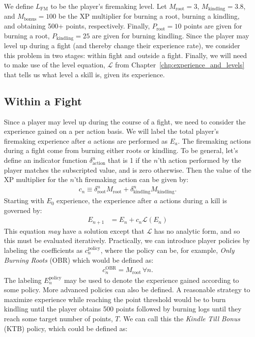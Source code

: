 	We define $L_\text{FM}$ to be the player's firemaking level. Let $M_\text{root}=3$, $M_\text{kindling}=3.8$, and $M_\text{bonus}=100$ be the XP multiplier for burning a root, burning a kindling, and obtaining 500+ points, respectively. Finally, $P_\text{root}=10$ points are given for burning a root, $P_\text{kindling}=25$ are given for burning kindling. Since the player may level up during a fight (and thereby change their experience rate), we consider this problem in two stages: within fight and outside a fight. Finally, we will need to make use of the level equation, $\mathcal{L}$ from Chapter~\ref{chp:experience_and_levels} that tells us what level a skill is, given its experience.

	\subsection{Within a Fight}
		Since a player may level up during the course of a fight, we need to consider the experience gained on a per action basis. We will label the total player's firemaking experience after $a$ actions are performed as $E_a$. The firemaking actions during a fight come from burning either roots or kindling. To be general, let's define an indicator function $\delta^n_\text{action}$ that is 1 if the $n$'th action performed by the player matches the subscripted value, and is zero otherwise. Then the value of the XP multiplier for the $n$'th firemaking action can be given by:
		\begin{align}
			c_n \equiv \delta_\text{root}^n M_\text{root} + \delta_\text{kindling}^n M_\text{kindling}.
		\end{align}
		Starting with $E_0$ experience, the experience after $a$ actions during a kill is governed by:
		\begin{align}
			E_{n+1} &= E_{n} + c_n\mathcal{L}(E_{n})
		\end{align}
		This equation \emph{may} have a solution except that $\mathcal{L}$ has no analytic form, and so this must be evaluated iteratively. Practically, we can introduce player policies by labeling the coefficients as $c_n^\text{policy}$, where the policy can be, for example, \emph{Only Burning Roots} (OBR) which would be defined as:
		\begin{align}
			c_n^\text{OBR} = M_\text{root}\,\forall n.
		\end{align}
		The labeling $E_{n}^\text{policy}$ may be used to denote the experience gained according to some policy.
		More advanced policies can also be defined. A reasonable strategy to maximize experience while reaching the point threshold would be to burn kindling until the player obtains 500 points followed by burning logs until they reach some target number of points, $T$. We can call this the \emph{Kindle Till Bonus} (KTB) policy, which could be defined as:
